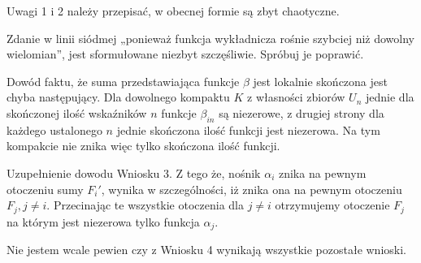 \documentclass[a4paper,11pt]{article}
\begin{document}
\vspace{\spaceFour}


\start {} Uwagi 1 i 2 należy przepisać, w obecnej formie są
zbyt chaotyczne.

\vspace{\spaceFour}


\start {} Zdanie w linii siódmej „ponieważ funkcja wykładnicza
rośnie szybciej niż dowolny wielomian”, jest sformułowane niezbyt
szczęśliwie. Spróbuj je poprawić.

\vspace{\spaceFour}


\start {} Dowód faktu, że suma przedstawiająca funkcje $\beta$
jest lokalnie skończona jest chyba następujący. Dla dowolnego kompaktu
$K$ z własności zbiorów $U_{ n }$ jednie dla skończonej ilość
wskaźników $n$ funkcje $\beta_{ i n }$ są niezerowe, z drugiej strony
dla każdego ustalonego $n$ jednie skończona ilość funkcji jest
niezerowa. Na tym kompakcie nie znika więc tylko skończona ilość
funkcji.

\vspace{\spaceFour}


\start {} Uzupełnienie dowodu Wniosku 3. Z tego że, nośnik
$\alpha_{ i }$ znika na pewnym otoczeniu sumy $F_{ i }'$, wynika w
szczególności, iż znika ona na pewnym otoczeniu $F_{ j }, j \neq i$.
Przecinając te wszystkie otoczenia dla $j \neq i$ otrzymujemy
otoczenie $F_{ j }$ na którym jest niezerowa tylko funkcja
$\alpha_{ j }$.

\vspace{\spaceFour}


\start {} Nie jestem wcale pewien czy z Wniosku 4 wynikają
wszystkie pozostałe wnioski.

\vspace{\spaceFour}
\end{document}
